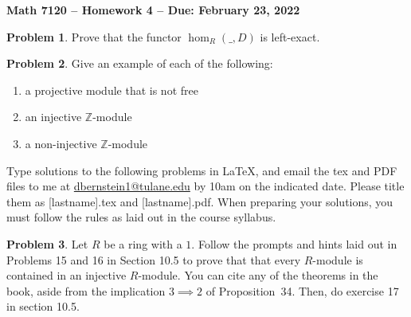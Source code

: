 \documentclass[letterpaper,11pt]{amsart}
\theoremstyle{plain}
\theoremstyle{definition}
\newtheorem{pr}{Problem}
\theoremstyle{remark}
\begin{document}
\Large

\begin{center}
{\bf Math 7120 -- Homework  4 --  Due:  February 23, 2022}
\end{center}

\normalsize

\medskip


\begin{pr}
    Prove that the functor $\hom_R(\_,D)$ is left-exact.
\end{pr}



\begin{pr}
    Give an example of each of the following:
    \begin{enumerate}
        \item a projective module that is not free
        \item an injective $\mathbb{Z}$-module
        \item a non-injective $\mathbb{Z}$-module
    \end{enumerate}
\end{pr}




\bigskip

Type solutions to the following problems in \LaTeX, and email the tex and PDF files to me at \url{dbernstein1@tulane.edu} by 10am on the indicated date.
Please title them as [lastname].tex and [lastname].pdf.
When preparing your solutions, you must follow the rules as laid out in the course syllabus.

\vspace{.5cm}


\begin{pr}
    Let $R$ be a ring with a $1$.
    Follow the prompts and hints laid out in Problems 15 and 16 in Section 10.5 to prove that
    that every $R$-module is contained in an injective $R$-module.
    You can cite any of the theorems in the book, aside from the implication $3 \implies 2$ of Proposition~34.
    Then, do exercise 17 in section 10.5.
\end{pr}
\end{document}
